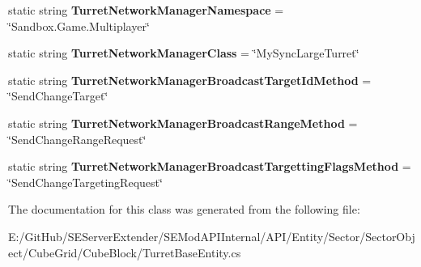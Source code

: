 \begin{DoxyCompactItemize}
\item 
\hypertarget{class_s_e_mod_a_p_i_internal_1_1_a_p_i_1_1_entity_1_1_sector_1_1_sector_object_1_1_cube_grid_1_1b51091c5d07b0b548101717ac1a5d6ae_a90f1bd1d3d6375dd3cc2d35958478bc3}{}static string {\bfseries Turret\+Network\+Manager\+Namespace} = \char`\"{}Sandbox.\+Game.\+Multiplayer\char`\"{}\label{class_s_e_mod_a_p_i_internal_1_1_a_p_i_1_1_entity_1_1_sector_1_1_sector_object_1_1_cube_grid_1_1b51091c5d07b0b548101717ac1a5d6ae_a90f1bd1d3d6375dd3cc2d35958478bc3}

\item 
\hypertarget{class_s_e_mod_a_p_i_internal_1_1_a_p_i_1_1_entity_1_1_sector_1_1_sector_object_1_1_cube_grid_1_1b51091c5d07b0b548101717ac1a5d6ae_a80feff55355a416cfc520e9cc2ad8a96}{}static string {\bfseries Turret\+Network\+Manager\+Class} = \char`\"{}My\+Sync\+Large\+Turret\char`\"{}\label{class_s_e_mod_a_p_i_internal_1_1_a_p_i_1_1_entity_1_1_sector_1_1_sector_object_1_1_cube_grid_1_1b51091c5d07b0b548101717ac1a5d6ae_a80feff55355a416cfc520e9cc2ad8a96}

\item 
\hypertarget{class_s_e_mod_a_p_i_internal_1_1_a_p_i_1_1_entity_1_1_sector_1_1_sector_object_1_1_cube_grid_1_1b51091c5d07b0b548101717ac1a5d6ae_abf0eae932fe9f90e25c36e866072e85b}{}static string {\bfseries Turret\+Network\+Manager\+Broadcast\+Target\+Id\+Method} = \char`\"{}Send\+Change\+Target\char`\"{}\label{class_s_e_mod_a_p_i_internal_1_1_a_p_i_1_1_entity_1_1_sector_1_1_sector_object_1_1_cube_grid_1_1b51091c5d07b0b548101717ac1a5d6ae_abf0eae932fe9f90e25c36e866072e85b}

\item 
\hypertarget{class_s_e_mod_a_p_i_internal_1_1_a_p_i_1_1_entity_1_1_sector_1_1_sector_object_1_1_cube_grid_1_1b51091c5d07b0b548101717ac1a5d6ae_a66e546d596772d967ff50c5a27be2e36}{}static string {\bfseries Turret\+Network\+Manager\+Broadcast\+Range\+Method} = \char`\"{}Send\+Change\+Range\+Request\char`\"{}\label{class_s_e_mod_a_p_i_internal_1_1_a_p_i_1_1_entity_1_1_sector_1_1_sector_object_1_1_cube_grid_1_1b51091c5d07b0b548101717ac1a5d6ae_a66e546d596772d967ff50c5a27be2e36}

\item 
\hypertarget{class_s_e_mod_a_p_i_internal_1_1_a_p_i_1_1_entity_1_1_sector_1_1_sector_object_1_1_cube_grid_1_1b51091c5d07b0b548101717ac1a5d6ae_ae5b039d7393ba187c13e00da618c0ef2}{}static string {\bfseries Turret\+Network\+Manager\+Broadcast\+Targetting\+Flags\+Method} = \char`\"{}Send\+Change\+Targeting\+Request\char`\"{}\label{class_s_e_mod_a_p_i_internal_1_1_a_p_i_1_1_entity_1_1_sector_1_1_sector_object_1_1_cube_grid_1_1b51091c5d07b0b548101717ac1a5d6ae_ae5b039d7393ba187c13e00da618c0ef2}

\end{DoxyCompactItemize}


The documentation for this class was generated from the following file\+:\begin{DoxyCompactItemize}
\item 
E\+:/\+Git\+Hub/\+S\+E\+Server\+Extender/\+S\+E\+Mod\+A\+P\+I\+Internal/\+A\+P\+I/\+Entity/\+Sector/\+Sector\+Object/\+Cube\+Grid/\+Cube\+Block/Turret\+Base\+Entity.\+cs\end{DoxyCompactItemize}
